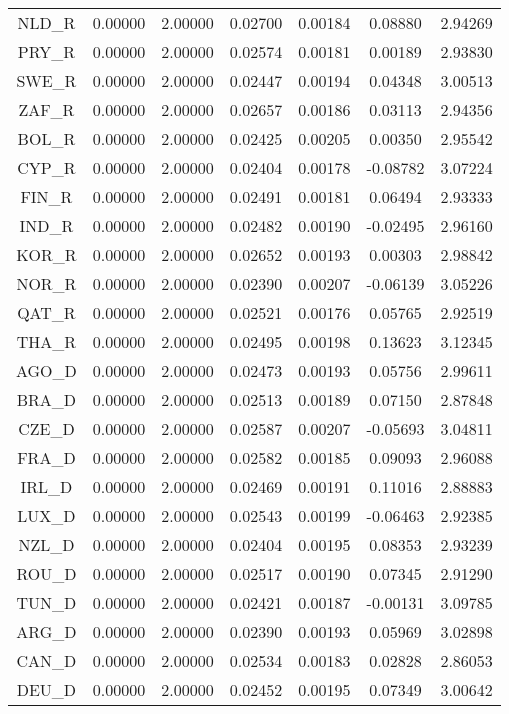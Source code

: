 \begin{longtable}{c c c c c c c}
NLD_R & 0.00000 & 2.00000 & 0.02700 & 0.00184 & 0.08880 & 2.94269 \\
PRY_R & 0.00000 & 2.00000 & 0.02574 & 0.00181 & 0.00189 & 2.93830 \\
SWE_R & 0.00000 & 2.00000 & 0.02447 & 0.00194 & 0.04348 & 3.00513 \\
ZAF_R & 0.00000 & 2.00000 & 0.02657 & 0.00186 & 0.03113 & 2.94356 \\
BOL_R & 0.00000 & 2.00000 & 0.02425 & 0.00205 & 0.00350 & 2.95542 \\
CYP_R & 0.00000 & 2.00000 & 0.02404 & 0.00178 & -0.08782 & 3.07224 \\
FIN_R & 0.00000 & 2.00000 & 0.02491 & 0.00181 & 0.06494 & 2.93333 \\
IND_R & 0.00000 & 2.00000 & 0.02482 & 0.00190 & -0.02495 & 2.96160 \\
KOR_R & 0.00000 & 2.00000 & 0.02652 & 0.00193 & 0.00303 & 2.98842 \\
NOR_R & 0.00000 & 2.00000 & 0.02390 & 0.00207 & -0.06139 & 3.05226 \\
QAT_R & 0.00000 & 2.00000 & 0.02521 & 0.00176 & 0.05765 & 2.92519 \\
THA_R & 0.00000 & 2.00000 & 0.02495 & 0.00198 & 0.13623 & 3.12345 \\
AGO_D & 0.00000 & 2.00000 & 0.02473 & 0.00193 & 0.05756 & 2.99611 \\
BRA_D & 0.00000 & 2.00000 & 0.02513 & 0.00189 & 0.07150 & 2.87848 \\
CZE_D & 0.00000 & 2.00000 & 0.02587 & 0.00207 & -0.05693 & 3.04811 \\
FRA_D & 0.00000 & 2.00000 & 0.02582 & 0.00185 & 0.09093 & 2.96088 \\
IRL_D & 0.00000 & 2.00000 & 0.02469 & 0.00191 & 0.11016 & 2.88883 \\
LUX_D & 0.00000 & 2.00000 & 0.02543 & 0.00199 & -0.06463 & 2.92385 \\
NZL_D & 0.00000 & 2.00000 & 0.02404 & 0.00195 & 0.08353 & 2.93239 \\
ROU_D & 0.00000 & 2.00000 & 0.02517 & 0.00190 & 0.07345 & 2.91290 \\
TUN_D & 0.00000 & 2.00000 & 0.02421 & 0.00187 & -0.00131 & 3.09785 \\
ARG_D & 0.00000 & 2.00000 & 0.02390 & 0.00193 & 0.05969 & 3.02898 \\
CAN_D & 0.00000 & 2.00000 & 0.02534 & 0.00183 & 0.02828 & 2.86053 \\
DEU_D & 0.00000 & 2.00000 & 0.02452 & 0.00195 & 0.07349 & 3.00642 \\

\end{longtable}
